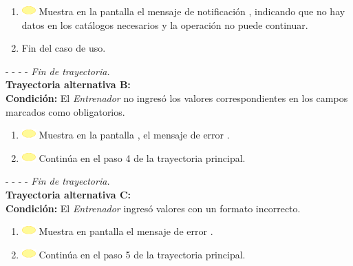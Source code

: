 \begin{enumerate}
	\item \includegraphics[width=15pt]{./Figuras/iconosCU/herramienta.png} Muestra en la pantalla  el mensaje de notificación , indicando que no hay datos en los catálogos necesarios y la operación no puede continuar.
	\item Fin del caso de uso.
\end{enumerate}

- - - - \textit{Fin de trayectoria.} \\

\textbf{\large{Trayectoria alternativa B:}}\\
\textbf{Condición: } El \textit{Entrenador} no ingresó los valores correspondientes  en los campos marcados como obligatorios.

\begin{enumerate}
	\item \includegraphics[width=15pt]{./Figuras/iconosCU/herramienta.png} Muestra en la pantalla , el mensaje de error .
	\item \includegraphics[width=15pt]{./Figuras/iconosCU/herramienta.png} Continúa en el paso 4 de la trayectoria principal.
\end{enumerate}

- - - - \textit{Fin de trayectoria.} \\

\textbf{\large{Trayectoria alternativa C:}}\\
\textbf{Condición: } El \textit{Entrenador} ingresó valores con un formato incorrecto.

\begin{enumerate}
	\item \includegraphics[width=15pt]{./Figuras/iconosCU/herramienta.png} Muestra en pantalla el mensaje de error .
	\item \includegraphics[width=15pt]{./Figuras/iconosCU/herramienta.png} Continúa en el paso 5 de la trayectoria principal.
\end{enumerate}

